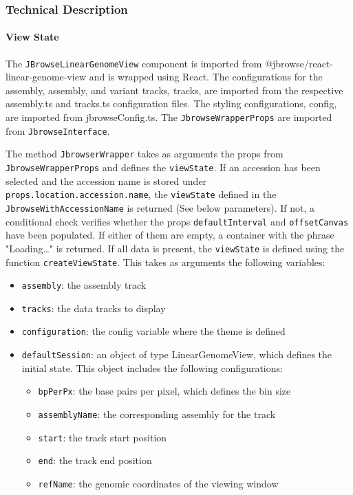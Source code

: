 \documentclass[12pt]{article}
\begin{document}
\begin{itemize}
\subsubsection{Technical Description}

\paragraph{View State} 
The \verb +JBrowseLinearGenomeView+ component is imported from @jbrowse/react-linear-genome-view and is wrapped using React. The configurations for the assembly, assembly, and variant tracks, tracks, are imported from the respective assembly.ts and tracks.ts configuration files. The styling configurations, config, are imported from jbrowseConfig.ts. The \verb +JbrowseWrapperProps+ are imported from \verb +JbrowseInterface+. 

The method \verb +JbrowserWrapper+ takes as arguments the props from \verb +JbrowseWrapperProps+ and defines the \verb +viewState+. If an accession has been selected and the accession name is stored under \verb +props.location.accession.name+, the \verb +viewState+ defined in the \verb +JbrowseWithAccessionName+ is returned (See below parameters). If not, a conditional check verifies whether the props \verb +defaultInterval+ and \verb +offsetCanvas+ have been populated. If either of them are empty, a container with the phrase "Loading…" is returned. If all data is present, the \verb +viewState+ is defined using the function \verb +createViewState+. This takes as arguments the following variables: 
\begin{itemize}
\item \verb +assembly+: the assembly track 
\item \verb +tracks+: the data tracks to display 
\item \verb +configuration+: the config variable where the theme is defined 
\item \verb +defaultSession+: an object of type LinearGenomeView, which defines the initial state. This object includes the following configurations: 
\begin{itemize}
\item \verb +bpPerPx+: the base pairs per pixel, which defines the bin size 
\item \verb +assemblyName+: the corresponding assembly for the track 
\item \verb +start+: the track start position 
\item \verb +end+: the track end position 
\item \verb +refName+: the genomic coordinates of the viewing window 
\end{itemize}
\end{itemize}


\end{itemize}
\end{document}
